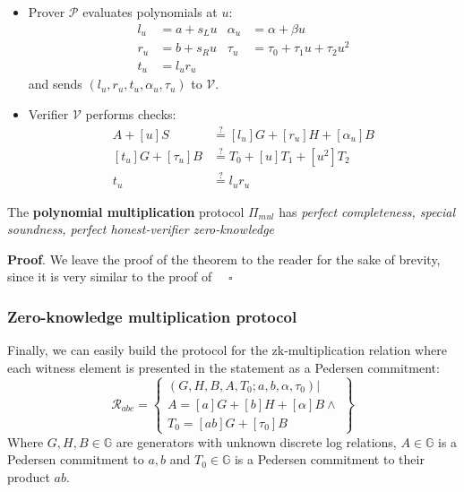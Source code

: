 \documentclass[../lecture-notes-148x210.tex]{subfiles}
\begin{document}
\begin{definition}
\begin{itemize}
\begin{itemize}
                \item Prover $\mathcal{P}$ evaluates polynomials at $u$:
                    \begin{equation}
                        \begin{aligned}
                            l_u & = a + s_L u & \alpha_u &= \alpha + \beta u\\
                            r_u &= b + s_R u & \tau_u &= \tau_0 + \tau_1 u + \tau_2 u^2\\
                            t_u &= l_u r_u & 
                        \end{aligned}
                    \end{equation}
                    and sends $(l_u, r_u, t_u, \alpha_u, \tau_u)$ to $\mathcal{V}$.
                \item Verifier $\mathcal{V}$ performs checks: 
                    \begin{equation}
                        \begin{aligned}
                            A + [u]S &\stackrel{\text{?}}{=} [l_u]G + [r_u]H + [\alpha_u]B \\
                            [t_u]G + [\tau_u]B &\stackrel{\text{?}}{=} T_0 + [u]T_1 + [u^2]T_2 \\
                            t_u &\stackrel{\text{?}}{=} l_u r_u
                        \end{aligned}
                    \end{equation}
            \end{itemize}
    \end{itemize}
\end{definition}

\begin{theorem}
    The \textbf{polynomial multiplication} protocol $\Pi_{mul}$ has \textit{perfect completeness, special soundness, perfect honest-verifier zero-knowledge}
    \label{th:poly_mul}
\end{theorem}
\textbf{Proof}. We leave the proof of the theorem to the reader for the sake of brevity, since it is very similar to the proof of  $\quad \square$

\subsubsection{Zero-knowledge multiplication protocol}

Finally, we can easily build the protocol for the zk-multiplication relation where each witness element is presented in the statement as a Pedersen commitment:
$$\mathcal{R}_{abc} = \left\{\begin{array}{l}
    (G,H,B,A,T_0;a,b, \alpha, \tau_0) \vert \\
    A = [a]G + [b]H + [\alpha]B \wedge \\
    T_0 = [ab]G + [\tau_0]B 
\end{array}\right\}$$
Where $G,H,B \in \mathbb{G}$ are generators with unknown discrete log relations, $A \in \mathbb{G}$ is a Pedersen commitment to $a,b$ and $T_0 \in \mathbb{G}$ is a Pedersen commitment to their product $ab$.
\end{document}
